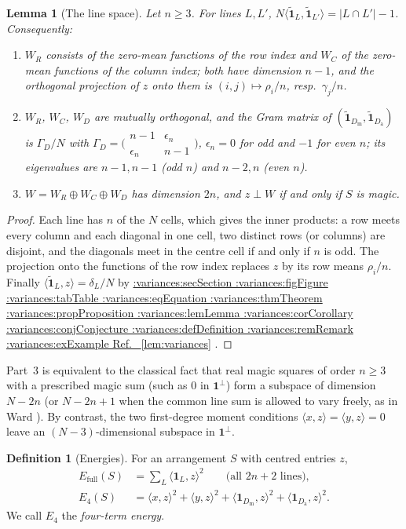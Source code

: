 \documentclass[11pt,a4paper]{article}
\makeatletter
\def\Cref@getprefix#1:#2\relax{#1}
\def\Cref@prefix@sec{sec}
\def\Cref@prefix@fig{fig}
\def\Cref@prefix@tab{tab}
\def\Cref@prefix@eq{eq}
\def\Cref@prefix@thm{thm}
\def\Cref@prefix@prop{prop}
\def\Cref@prefix@lem{lem}
\def\Cref@prefix@cor{cor}
\def\Cref@prefix@conj{conj}
\def\Cref@prefix@def{def}
\def\Cref@prefix@rem{rem}
\def\Cref@prefix@ex{ex}
\def\Cref@type@cap#1{%
  \edef\Cref@tmp{#1}%
  \ifx\Cref@tmp\Cref@prefix@sec Section%
  \else\ifx\Cref@tmp\Cref@prefix@fig Figure%
  \else\ifx\Cref@tmp\Cref@prefix@tab Table%
  \else\ifx\Cref@tmp\Cref@prefix@eq Equation%
  \else\ifx\Cref@tmp\Cref@prefix@thm Theorem%
  \else\ifx\Cref@tmp\Cref@prefix@prop Proposition%
  \else\ifx\Cref@tmp\Cref@prefix@lem Lemma%
  \else\ifx\Cref@tmp\Cref@prefix@cor Corollary%
  \else\ifx\Cref@tmp\Cref@prefix@conj Conjecture%
  \else\ifx\Cref@tmp\Cref@prefix@def Definition%
  \else\ifx\Cref@tmp\Cref@prefix@rem Remark%
  \else\ifx\Cref@tmp\Cref@prefix@ex Example%
  \else Ref.%
  \fi\fi\fi\fi\fi\fi\fi\fi\fi\fi\fi\fi
}
\DeclareRobustCommand{\Cref}[1]{%
  \begingroup
  \edef\Cref@label{#1}%
  \edef\Cref@prefix{\expandafter\Cref@getprefix\Cref@label:\relax}%
  \hyperref[#1]{\Cref@type@cap{\Cref@prefix}~\ref*{#1}}%
  \endgroup
}
\theoremstyle{plain}
\newtheorem{lemma}[theorem]{Lemma}
\theoremstyle{definition}
\newtheorem{definition}[theorem]{Definition}
\theoremstyle{remark}
\newcommand{\Efull}{E_{\mathrm{full}}}
\newcommand{\Efour}{E_4}
\makeatother
\begin{document}
\begin{lemma}[The line space]
\label{lem:W_structure}
Let $n\ge3$.  For lines $L,L'$, $N\langle\tilde{\mathbf 1}_L,\tilde{\mathbf 1}_{L'}\rangle=|L\cap L'|-1$.  Consequently:
\begin{enumerate}
\item $W_R$ consists of the zero-mean functions of the row index and $W_C$ of the zero-mean functions of the column index; both have dimension $n-1$, and the orthogonal projection of $z$ onto them is $(i,j)\mapsto\rho_i/n$, resp.\ $\gamma_j/n$.
\item $W_R$, $W_C$, $W_D$ are mutually orthogonal, and the Gram matrix of $(\tilde{\mathbf 1}_{D_{\mathrm m}},\tilde{\mathbf 1}_{D_{\mathrm a}})$ is $\Gamma_D/N$ with $\Gamma_D=\bigl(\begin{smallmatrix}n-1&\epsilon_n\\ \epsilon_n&n-1\end{smallmatrix}\bigr)$, $\epsilon_n=0$ for odd and $-1$ for even $n$; its eigenvalues are $n-1,n-1$ (odd $n$) and $n-2,n$ (even $n$).
\item $W=W_R\oplus W_C\oplus W_D$ has dimension $2n$, and $z\perp W$ if and only if $S$ is magic.
\end{enumerate}
\end{lemma}

\begin{proof}
Each line has $n$ of the $N$ cells, which gives the inner products: a row meets every column and each diagonal in one cell, two distinct rows (or columns) are disjoint, and the diagonals meet in the centre cell if and only if $n$ is odd.  The projection onto the functions of the row index replaces $z$ by its row means $\rho_i/n$.  Finally $\langle\tilde{\mathbf 1}_L,z\rangle=\delta_L/N$ by \Cref{lem:variances}.
\end{proof}

Part~3 is equivalent to the classical fact that real magic squares of order $n\ge3$ with a prescribed magic sum (such as $0$ in $\mathbf 1^\perp$) form a subspace of dimension $N-2n$ (or $N-2n+1$ when the common line sum is allowed to vary freely, as in Ward \cite{ward1980vector}). By contrast, the two first-degree moment conditions $\langle x,z\rangle=\langle y,z\rangle=0$ leave an $(N-3)$-dimensional subspace in $\mathbf 1^\perp$.

\begin{definition}[Energies]
\label{def:energies}
For an arrangement $S$ with centred entries $z$,
\begin{align}
\Efull(S)&=\sum_{L}\langle\mathbf 1_L,z\rangle^{2}\qquad\text{(all $2n+2$ lines)},\label{eq:Efull}\\
\Efour(S)&=\langle x,z\rangle^{2}+\langle y,z\rangle^{2}+\langle\mathbf 1_{D_{\mathrm m}},z\rangle^{2}+\langle\mathbf 1_{D_{\mathrm a}},z\rangle^{2}.\label{eq:Elow}
\end{align}
We call $\Efour$ the \emph{four-term energy}.
\end{definition}
\end{document}
